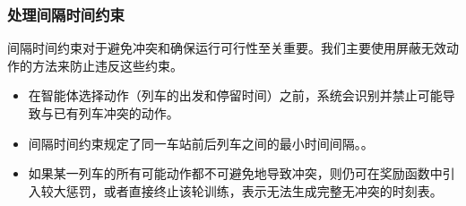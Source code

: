 \documentclass{article}
\begin{document}
    \subsubsection{处理间隔时间约束}
    间隔时间约束对于避免冲突和确保运行可行性至关重要。我们主要使用屏蔽无效动作的方法来防止违反这些约束。
    \begin{itemize}
        \item 在智能体选择动作（列车的出发和停留时间）之前，系统会识别并禁止可能导致与已有列车冲突的动作。
        \item 间隔时间约束规定了同一车站前后列车之间的最小时间间隔。。
        \item 如果某一列车的所有可能动作都不可避免地导致冲突，则仍可在奖励函数中引入较大惩罚，或者直接终止该轮训练，表示无法生成完整无冲突的时刻表。
    \end{itemize}
\end{document}
